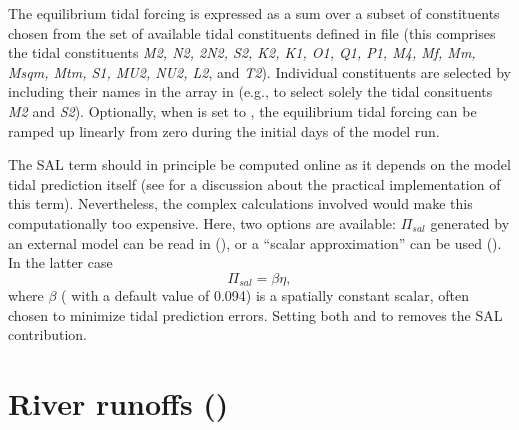 \documentclass[../main/NEMO_manual]{subfiles}
\begin{document}
The equilibrium tidal forcing is expressed as a sum over a subset of
constituents chosen from the set of available tidal constituents
defined in file  (this comprises the tidal
constituents \textit{M2, N2, 2N2, S2, K2, K1, O1, Q1, P1, M4, Mf, Mm,
  Msqm, Mtm, S1, MU2, NU2, L2}, and \textit{T2}). Individual
constituents are selected by including their names in the array
 in  (e.g.,  to select solely the tidal consituents \textit{M2}
and \textit{S2}). Optionally, when  is set to
, the equilibrium tidal forcing can be ramped up
linearly from zero during the initial  days of the
model run.

The SAL term should in principle be computed online as it depends on
the model tidal prediction itself (see \citet{Arbic2004} for a
discussion about the practical implementation of this term).
Nevertheless, the complex calculations involved would make this
computationally too expensive.  Here, two options are available:
$\Pi_{sal}$ generated by an external model can be read in
(), or a ``scalar approximation'' can be
used (). In the latter case
\[
  \Pi_{sal} = \beta \eta,
\]
where $\beta$ ( with a default value of 0.094) is a
spatially constant scalar, often chosen to minimize tidal prediction
errors. Setting both  and  to
 removes the SAL contribution.

\section{River runoffs (\protect{})}
\label{sec:SBC_rnf}


\end{document}
